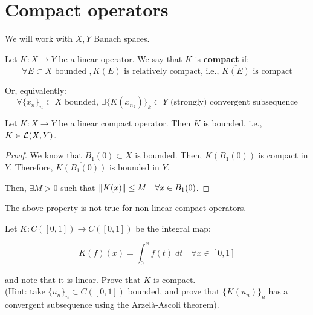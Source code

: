 \chapter{Compact operators}

\begin{note}
    We will work with $X, Y$ Banach spaces.
\end{note}

\begin{fdefinition}
    Let $K: X \to Y$ be a linear operator. We say that $K$ is \textbf{compact} if:
    $$\forall E \subset X \text{ bounded }, K(E) \text{ is relatively compact, i.e., } \overline{K(E)} \text{ is compact}$$

    Or, equivalently:
    $$\forall \{x_n\}_n \subset X \text{ bounded, } \exists \{K(x_{n_k})\}_k \subset Y \text{ (strongly) convergent subsequence}$$

\end{fdefinition}

\vspace{1em}

\begin{fproposition}
    Let $K: X \to Y$ be a linear compact operator. Then $K$ is bounded, i.e., $K \in \mathcal{L}(X, Y)$.
\end{fproposition}

\begin{proof}
    We know that $B_1(0) \subset X$ is bounded. Then, $\overline{K(B_1(0))}$ is compact in $Y$.
    Therefore, $\overline{K(B_1(0))}$ is bounded in $Y$.

    Then, $\exists M > 0$ such that $\left\|K(x)\right\| \leq M \quad \forall x \in B_1(0)$.
\end{proof}

\begin{fremark}
    The above property is not true for non-linear compact operators.
\end{fremark}

\begin{fexercise}
    Let $K: C([0, 1]) \to C([0, 1])$ be the integral map:

    $$K(f)(x) = \int_0^x f(t) \; dt \quad \forall x \in [0, 1]$$

    and note that it is linear. Prove that $K$ is compact.\\
    
    (Hint: take $\{u_n\}_n \subset C([0,1])$ bounded, and prove that $\{K(u_n)\}_n$ has a convergent subsequence
    using the Arzelà-Ascoli theorem).
\end{fexercise}

